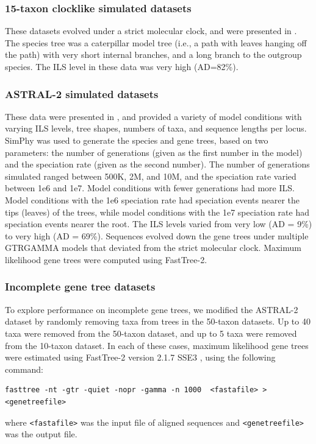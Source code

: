 \subsubsection{15-taxon clocklike simulated datasets}
These datasets evolved under a strict molecular clock, and
were presented in
\cite{bayzid2014weighted}.  The species tree was a
caterpillar model tree (i.e., a path with leaves hanging off the
path) with very short internal branches,
and a long branch to the outgroup species. 
The ILS level in these data was very high (AD=82\%).






\subsubsection{ASTRAL-2 simulated datasets}
These data were presented in \cite{ASTRALII}, and provided a
variety of model conditions with varying ILS levels, tree shapes,
numbers of taxa, and sequence lengths per locus.  
SimPhy \cite{SimPhy} was used to generate the species
and gene trees, based on
two parameters: the number of generations (given as the
first number in the model)
and the speciation rate (given as the second
number).   %
The number of generations simulated ranged between
  500K, 2M, and 10M, and
  the speciation rate varied between  1e6 and 1e7.
  Model conditions with fewer generations had more ILS.
  Model conditions with the 1e6 speciation rate had speciation events
  nearer the tips (leaves) of the trees, while model conditions with the 1e7
  speciation rate had speciation events nearer the root.
The ILS levels varied from very low (AD = 9\%) to 
very high (AD = 69\%).
Sequences evolved down the gene trees under 
multiple  GTRGAMMA models that deviated from the strict
molecular clock. 
Maximum likelihood gene trees were computed using FastTree-2.
\subsubsection{Incomplete gene tree datasets}
To explore performance on incomplete gene trees, 
we modified the ASTRAL-2 dataset by randomly removing taxa from trees
in the  50-taxon datasets. Up to 40 taxa were removed from the
50-taxon dataset, and up to 5 taxa were removed from the 10-taxon
dataset. In each of these cases, 
maximum likelihood gene trees were estimated using
FastTree-2 version 2.1.7 SSE3 \cite{Price2010}, using the following
command:
\begin{verbatim}
fasttree -nt -gtr -quiet -nopr -gamma -n 1000  <fastafile> > <genetreefile>
\end{verbatim}
\noindent
where {\tt <fastafile>} was the input file of aligned sequences and {\tt <genetreefile>} was the output file.

